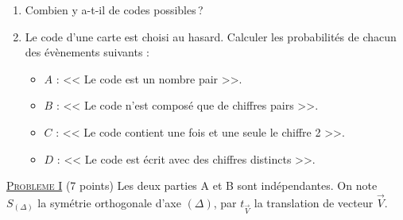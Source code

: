 \begin{description}
                  \begin{enumerate}
                        \item Combien y a-t-il de codes possibles\,?
                        \item Le code d'une carte est choisi au hasard.
                              Calculer les probabilit\'es de chacun des \'ev\`enements suivants :
                              \begin{itemize}
                                    \item $A$ : << Le code est un nombre pair >>.
                                    \item $B$ : << Le code n'est compos\'e que de chiffres pairs >>.
                                    \item $C$ : << Le code contient une fois et une seule le chiffre 2 >>.
                                    \item $D$ : << Le code est \'ecrit avec des chiffres distincts >>.
                              \end{itemize}
                  \end{enumerate}
      \end{description}

\noindent \underline{\textsc{Probleme I}} (7 points) \newline
      Les deux parties A et B sont ind\'ependantes.
      On note $S_{(\Delta)}$ la sym\'etrie orthogonale d'axe $(\Delta)$,
      par $t_{\vec{V}}$ la translation de vecteur $\overrightarrow{V}$.
      

